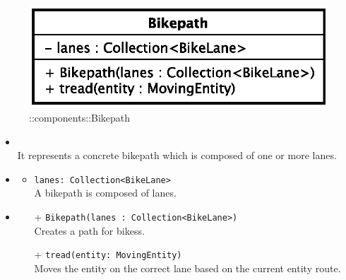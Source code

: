 \begin{figure}[h]
\centering
\includegraphics[scale=0.6,keepaspectratio]{images/solution/app/backend/bikepath.eps}
\caption{\pReactiveComponent::components::Bikepath}
\label{fig:sd-app-bikepath}
\end{figure}
\FloatBarrier
\begin{itemize}
  \item \textbf{\descr} \\
    It represents a concrete bikepath which is composed of one or more lanes.
  \item \textbf{\attrs}
  \begin{itemize}
    \item \texttt{lanes: Collection<BikeLane>} \\
A bikepath is composed of lanes.
  \end{itemize}
  \item \textbf{\ops}
  \begin{itemize}
  \item[+] \texttt{Bikepath(lanes : Collection<BikeLane>)} \\
    Creates a path for bikess.
    \item[+] \texttt{tread(entity: MovingEntity)} \\
Moves the entity on the correct lane based on the current entity route. 
  \end{itemize}
\end{itemize}

